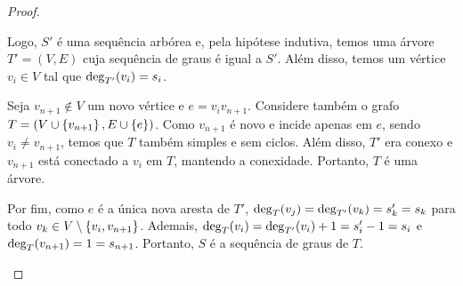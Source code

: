 \begin{proof}
\begin{ncasos}
        Logo, $S'$ é uma sequência arbórea e, pela hipótese indutiva, temos uma árvore $T' = (V, E)$ cuja sequência de graus é igual a $S'$. Além disso, temos um vértice $v_i \in V$ tal que $\operatorname{deg}_{T'}(v_i) = s_i$.

        Seja $v_{n + 1} \not\in V$ um novo vértice e $e = v_i v_{n + 1}$. Considere também o grafo $T = (V \cup \set{v_{n + 1}}, E \cup \set{e})$. Como $v_{n + 1}$ é novo e incide apenas em $e$, sendo $v_i \ne v_{n +1}$, temos que $T$ também simples e sem ciclos. Além disso, $T'$ era conexo e $v_{n + 1}$ está conectado a $v_i$ em $T$, mantendo a conexidade. Portanto, $T$ é uma árvore.

        Por fim, como $e$ é a única nova aresta de $T'$, $\operatorname{deg}_T(v_j) = \operatorname{deg}_{T'}(v_k) = s'_k = s_k$ para todo $v_k \in V \setminus \set{v_i, v_{n +1}}$. Ademais, $\operatorname{deg}_T(v_i) = \operatorname{deg}_{T'}(v_i) + 1 = s'_i - 1 = s_i$ e $\operatorname{deg}_T(v_{n + 1}) = 1 = s_{n + 1}$. Portanto, $S$ é a sequência de graus de $T$.
    \end{ncasos}
\end{proof}
